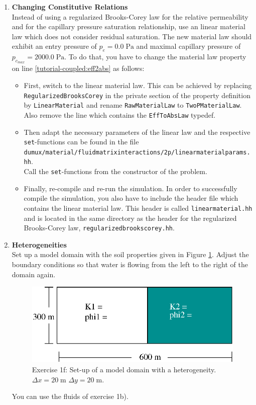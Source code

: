 \begin{enumerate}
\item \textbf{Changing Constitutive Relations} \\
  Instead of using a regularized Brooks-Corey law for the relative
  permeability and for the capillary pressure saturation relationship,
  use an linear material law which does not consider residual
  saturation. The new material law should exhibit an entry pressure of
  $p_e = 0.0\;\text{Pa}$ and maximal capillary pressure of
  $p_{c_{max}} = 2000.0\;\text{Pa}$. To do that, you have to change
  the material law property on line
  \ref{tutorial-coupled:eff2abs} as follows:
\begin{itemize}
\item First, switch to the linear material law. This can be achieved
  by replacing \texttt{RegularizedBrooksCorey} in the private section
  of the property definition by \texttt{LinearMaterial} and rename
  \texttt{RawMaterialLaw} to \texttt{TwoPMaterialLaw}. Also remove the
  line which contains the \texttt{EffToAbsLaw} typedef.
\item Then adapt the necessary parameters of the linear law and the
  respective \texttt{set}-functions can be found in the file
  \texttt{dumux/material/fluidmatrixinteractions/2p/linearmaterialparams.hh}.\\
  Call the \texttt{set}-functions from the constructor of the problem.
\item Finally, re-compile and re-run the simulation. In order to
  successfully compile the simulation, you also have to include the
  header file which contains the linear material law. This header is
  called \texttt{linearmaterial.hh} and is located in the same
  directory as the header for the regularized Brooks-Corey law,
  \texttt{regularizedbrookscorey.hh}.
\end{itemize}
 
\item \textbf{Heterogeneities}  \\
  Set up a model domain with the soil properties given in Figure
  \ref{tutorial-coupled:exercise1_d}. Adjust the boundary conditions
  so that water is flowing from the left to the right of the domain again.
\begin{figure}[ht]
\centering
\includegraphics[width=0.5\linewidth,keepaspectratio]{EPS/exercise1_c.eps}
\caption{Exercise 1f: Set-up of a model domain with a heterogeneity. $\Delta x = 20 \;\text{m}$ $\Delta y = 20\;\text{m}$.}\label{tutorial-coupled:exercise1_d}
\end{figure}
You can use the fluids of exercise 1b).


\end{enumerate}
